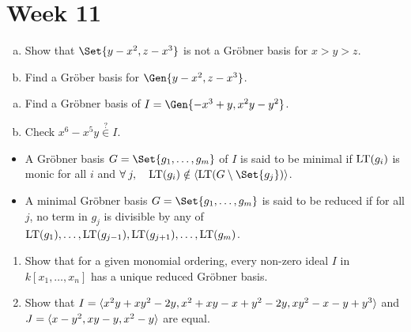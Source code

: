 
\section{Week 11}

\begin{exercise} \mbox{}
  \begin{enumerate}[(a)]
    \item Show that $\Set{ y-x^2, z-x^3 }$ is not a Gr\"obner basis for $x>y>z$.
    \item Find a Gr\"ober basis for $\Gen{ y-x^2, z-x^3 }$.
  \end{enumerate}
\end{exercise}

\begin{exercise} \mbox{}
  \begin{enumerate}[(a)]
    \item Find a Gr\"obner basis of $I = \Gen{ -x^3+y, x^2y - y^2 }$.
    \item Check $x^6 - x^5y \overset{?}{\in} I$.
  \end{enumerate}
\end{exercise}

\begin{definition} \mbox{}
  \begin{itemize}
    \item A Gr\"obner basis $G = \Set{g_1, \dots, g_m}$ of $I$ is said to be
      minimal if $\operatorname{LT}(g_i)$ is monic for all $i$ and $\forall j, \quad
      \LT(g_i) \notin \gen{\LT(G \setminus\Set{g_j})}$.
    \item A minimal Gr\"obner basis $G = \Set{g_1, \dots, g_m}$ is said to be
      reduced if for all $j$, no term in $g_j$ is divisible by any of
      $\operatorname{LT}(g_1), \dots, \operatorname{LT}(g_{j-1}), \operatorname{LT}(g_{j+1}), \dots, \operatorname{LT}(g_m)$.
  \end{itemize}
\end{definition}

\begin{exercise} \mbox{}
  \begin{enumerate}
    \item Show that for a given monomial ordering, every non-zero ideal $I$ in
      $k[x_1, \dots, x_n]$ has a unique reduced Gr\"obner basis.
    \item Show that $I = \langle x^2y+xy^2-2y, x^2+xy-x+y^2-2y, xy^2-x-y+y^3\rangle$
      and $J = \langle x-y^2, xy-y, x^2-y\rangle$ are equal.
  \end{enumerate}
\end{exercise}

